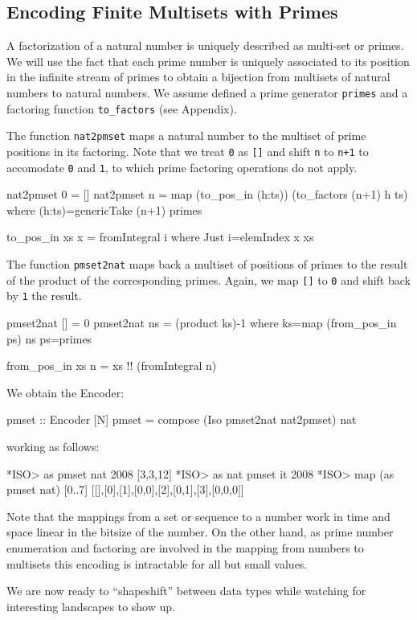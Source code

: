 \documentclass[]{INCLUDES/llncs}
\begin{document}
\subsection{Encoding Finite Multisets with Primes}

A factorization of a natural number is uniquely
described as multi-set or primes. We will use the fact that each prime number 
is uniquely associated to its position in the infinite stream of primes
to obtain a bijection from multisets of natural numbers to natural numbers.
We assume defined a prime generator {\tt primes} and a factoring function
{\tt to\_factors} (see Appendix).

The function {\tt nat2pmset} maps a natural number to the multiset of prime
positions in its factoring. Note that we treat {\tt 0} as {\tt []} and shift
{\tt n} to {\tt n+1} to accomodate {\tt 0} and {\tt 1}, to which prime factoring
operations do not apply.
\begin{code}
nat2pmset 0 = []
nat2pmset n = map (to_pos_in (h:ts)) (to_factors (n+1) h ts) where
  (h:ts)=genericTake (n+1) primes
  
to_pos_in xs x = fromIntegral i where
   Just i=elemIndex x xs
\end{code}

The function {\tt pmset2nat} maps back a multiset of positions of primes to
the result of the product of the corresponding primes. Again, we map {\tt []} to
{\tt 0} and shift back by {\tt 1} the result.
\begin{code}
pmset2nat [] = 0
pmset2nat ns = (product ks)-1 where
  ks=map (from_pos_in ps) ns
  ps=primes

from_pos_in xs n = xs !! (fromIntegral n)
\end{code}
We obtain the Encoder:
\begin{code}
pmset :: Encoder [N]
pmset = compose (Iso pmset2nat nat2pmset) nat
\end{code}
working as follows:
\begin{codex}
*ISO> as pmset nat 2008
[3,3,12]
*ISO> as nat pmset it
2008
*ISO> map (as pmset nat) [0..7]
[[],[0],[1],[0,0],[2],[0,1],[3],[0,0,0]]
\end{codex}
Note that the mappings from a set or sequence to a number work in time and
space linear in the bitsize of the number. On the other hand, as prime number
enumeration and factoring are involved in the mapping from numbers to multisets
this encoding is intractable for all but small values.

We are now ready to ``shapeshift'' between data types while watching for
interesting landscapes to show up.
\end{document}
